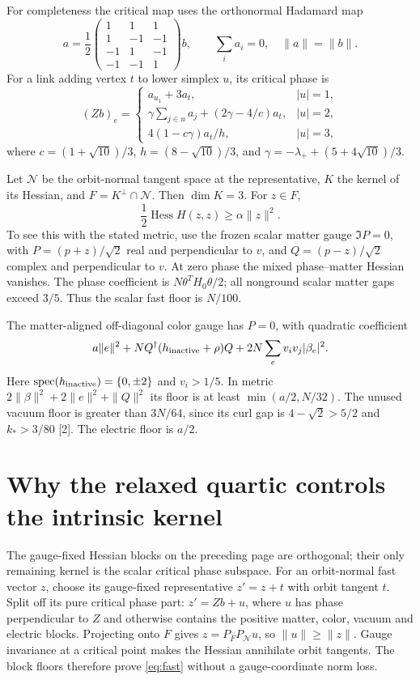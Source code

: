 \documentclass[11pt,a4paper]{article}
\begin{document}
For completeness the critical map uses the orthonormal Hadamard map
\[
a=\frac12\begin{pmatrix}1&1&1\\1&-1&-1\\-1&1&-1\\-1&-1&1\end{pmatrix}b,
\qquad \sum_i a_i=0,\quad \|a\|=\|b\|.
\]
For a link adding vertex $t$ to lower simplex $u$, its critical phase is
\[
(Zb)_e=\begin{cases}
a_{u_1}+3a_t,&|u|=1,\\
\gamma\sum_{j\in u}a_j+(2\gamma-4/c)a_t,&|u|=2,\\
4(1-c\gamma)a_t/h,&|u|=3,
\end{cases}
\]
where $c=(1+\sqrt{10})/3$, $h=(8-\sqrt{10})/3$, and $\gamma=-\lambda_++(5+4\sqrt{10})/3$.

Let $\mathcal N$ be the orbit-normal tangent space at the representative, $K$ the kernel of its Hessian, and $F=K^\perp\cap\mathcal N$. Then $\dim K=3$. For $z\in F$,
\begin{equation}\label{eq:fast}
\frac12\operatorname{Hess}H(z,z)\ge\alpha\|z\|^2.
\end{equation}
To see this with the stated metric, use the frozen scalar matter gauge $\Im P=0$, with $P=(p+z)/\sqrt2$ real and perpendicular to $v$, and $Q=(p-z)/\sqrt2$ complex and perpendicular to $v$. At zero phase the mixed phase--matter Hessian vanishes. The phase coefficient is $N\theta^TH_0\theta/2$; all nonground scalar matter gaps exceed $3/5$. Thus the scalar fast floor is $N/100$.

The matter-aligned off-diagonal color gauge has $P=0$, with quadratic coefficient
\[
a\|e\|^2+NQ^\dagger(h_{\rm inactive}+\rho)Q
+2N\sum_e v_iv_j|\beta_e|^2.
\]
Here $\operatorname{spec}(h_{\rm inactive})=\{0,\pm2\}$ and $v_i>1/5$. In metric $2\|\beta\|^2+2\|e\|^2+\|Q\|^2$ its floor is at least $\min(a/2,N/32)$. The unused vacuum floor is greater than $3N/64$, since its curl gap is $4-\sqrt2>5/2$ and $k_*>3/80$ [2]. The electric floor is $a/2$.
\newpage
\section{Why the relaxed quartic controls the intrinsic kernel}
The gauge-fixed Hessian blocks on the preceding page are orthogonal; their only remaining kernel is the scalar critical phase subspace. For an orbit-normal fast vector $z$, choose its gauge-fixed representative $z'=z+t$ with orbit tangent $t$. Split off its pure critical phase part: $z'=Zb+u$, where $u$ has phase perpendicular to $Z$ and otherwise contains the positive matter, color, vacuum and electric blocks. Projecting onto $F$ gives $z=P_F P_{\mathcal N}u$, so $\|u\|\ge\|z\|$. Gauge invariance at a critical point makes the Hessian annihilate orbit tangents. The block floors therefore prove \eqref{eq:fast} without a gauge-coordinate norm loss.
\end{document}
